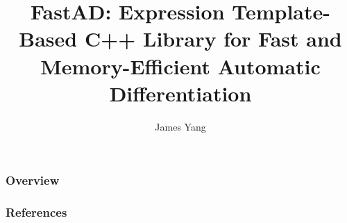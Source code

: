 \documentclass{beamer}
\title[FastAD:\@ C++ Template Library for AD]
{%
    FastAD:\@ 
    Expression Template-Based
    C++ Library for
    Fast and Memory-Efficient
    Automatic Differentiation
}
\author{James Yang}
\institute{%
    Department of Statistics, Stanford University
    \email{jy2816@stanford.edu}
}
\begin{document}
\begin{frame}
\titlepage
\end{frame}

\begin{frame}
\frametitle{Overview}
\tableofcontents 
\end{frame}











\begin{frame}[allowframebreaks]
\frametitle{References}


\end{frame}
\end{document}
